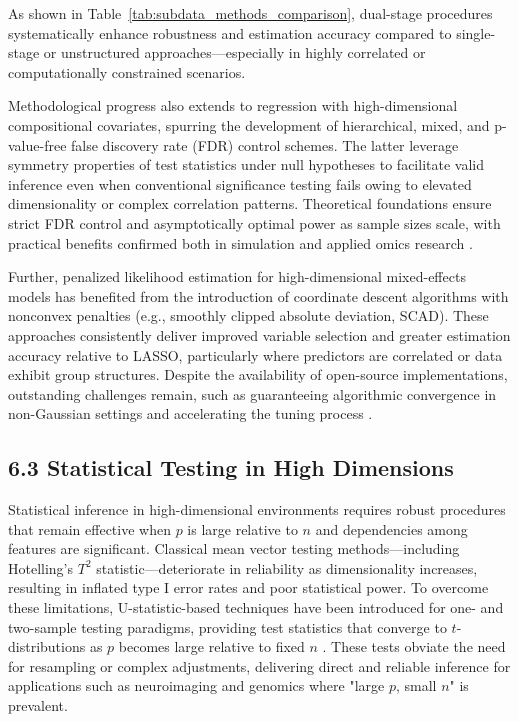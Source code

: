 \documentclass[11pt]{article}
\begin{document}
As shown in Table~\ref{tab:subdata_methods_comparison}, dual-stage procedures systematically enhance robustness and estimation accuracy compared to single-stage or unstructured approaches—especially in highly correlated or computationally constrained scenarios.

Methodological progress also extends to regression with high-dimensional compositional covariates, spurring the development of hierarchical, mixed, and p-value-free false discovery rate (FDR) control schemes. The latter leverage symmetry properties of test statistics under null hypotheses to facilitate valid inference even when conventional significance testing fails owing to elevated dimensionality or complex correlation patterns. Theoretical foundations ensure strict FDR control and asymptotically optimal power as sample sizes scale, with practical benefits confirmed both in simulation and applied omics research \cite{ref102}.

Further, penalized likelihood estimation for high-dimensional mixed-effects models has benefited from the introduction of coordinate descent algorithms with nonconvex penalties (e.g., smoothly clipped absolute deviation, SCAD). These approaches consistently deliver improved variable selection and greater estimation accuracy relative to LASSO, particularly where predictors are correlated or data exhibit group structures. Despite the availability of open-source implementations, outstanding challenges remain, such as guaranteeing algorithmic convergence in non-Gaussian settings and accelerating the tuning process \cite{ref116}.

\subsection{6.3 Statistical Testing in High Dimensions}

Statistical inference in high-dimensional environments requires robust procedures that remain effective when $p$ is large relative to $n$ and dependencies among features are significant. Classical mean vector testing methods—including Hotelling’s $T^2$ statistic—deteriorate in reliability as dimensionality increases, resulting in inflated type I error rates and poor statistical power. To overcome these limitations, U-statistic-based techniques have been introduced for one- and two-sample testing paradigms, providing test statistics that converge to $t$-distributions as $p$ becomes large relative to fixed $n$ \cite{ref91}. These tests obviate the need for resampling or complex adjustments, delivering direct and reliable inference for applications such as neuroimaging and genomics where "large $p$, small $n$" is prevalent.
\end{document}
